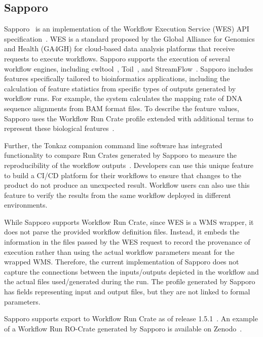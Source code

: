 \documentclass[10pt,letterpaper]{article}
\begin{document}
\subsection{Sapporo}\label{sapporo}

Sapporo~\cite{Suetake 2022a} is an implementation of the Workflow Execution Service (WES) API specification~\cite{Rehm 2021}.
WES is a standard proposed by the Global Alliance for Genomics and Health (GA4GH) for cloud-based data analysis platforms that receive requests to execute workflows.
Sapporo supports the execution of several workflow engines, including cwltool~\cite{Amstutz 2023}, Toil~\cite{Vivian 2017}, and StreamFlow~\cite{Colonnelli 2021}.
Sapporo includes features specifically tailored to bioinformatics applications, including the calculation of feature statistics from specific types of outputs generated by workflow runs.
For example, the system calculates the mapping rate of DNA sequence alignments from BAM format files.
To describe the feature values, Sapporo uses the Workflow Run Crate profile extended with additional terms to represent these biological features~\cite{sapporo-terms}.

Further, the Tonkaz companion command line software has integrated functionality to compare Run Crates generated by Sapporo to measure the reproducibility of the workflow outputs~\cite{Suetake 2023}.
Developers can use this unique feature to build a CI/CD platform for their workflows to ensure that changes to the product do not produce an unexpected result.
Workflow users can also use this feature to verify the results from the same workflow deployed in different environments.

While Sapporo supports Workflow Run Crate, since WES is a WMS wrapper, it does not parse the provided workflow definition files. 
Instead, it embeds the information in the files passed by the WES request to record the provenance of execution rather than using the actual workflow parameters meant for the wrapped WMS.
Therefore, the current implementation of Sapporo does not capture the connections between the inputs/outputs depicted in the workflow and the actual files used/generated during the run.
The profile generated by Sapporo has fields representing input and output files, but they are not linked to formal parameters.

Sapporo supports export to Workflow Run Crate as of release 1.5.1~\cite{Suetake 2023b}. An example of a Workflow Run RO-Crate generated by Sapporo is available on Zenodo~\cite{Ohta 2023}.
\end{document}
